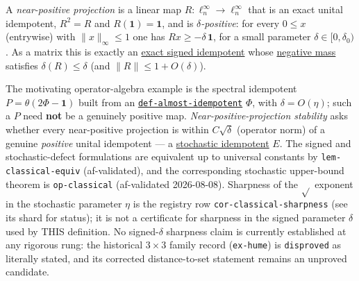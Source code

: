 \hypertarget{def:near-positive-projection}{}%
\begin{definition}\label{def:near-positive-projection}
A \emph{near-positive projection} is a linear map
$R\colon\ell^\infty_n\to\ell^\infty_n$ that is an exact unital idempotent, $R^2=R$ and
$R(\mathbf 1)=\mathbf 1$, and is \emph{$\delta$-positive}: for every $0\le x$ (entrywise) with
$\lVert x\rVert_\infty\le1$ one has $Rx\ge-\delta\,\mathbf 1$, for a small parameter
$\delta\in[0,\delta_0)$. As a matrix this is exactly an \hyperref[def:signed-idempotent]{exact signed idempotent}
whose \hyperref[def:negative-mass]{negative mass} satisfies $\delta(R)\le\delta$ (and $\lVert R\rVert\le1+O(\delta)$).

The motivating operator-algebra example is the spectral idempotent $P=\theta(2\Phi-\mathbf 1)$ built from
an \hyperref[def:almost-idempotent]{\texttt{def-\allowbreak{}almost-\allowbreak{}idempotent}} $\Phi$, with $\delta=O(\eta)$; such a $P$ need \textbf{not} be a genuinely
positive map. \emph{Near-positive-projection stability} asks
whether every near-positive projection is within $C\sqrt\delta$ (operator norm) of a genuine \emph{positive}
unital idempotent --- a \hyperref[def:stochastic]{stochastic idempotent} $E$. The signed and
stochastic-defect formulations are equivalent up to universal constants by
\texttt{lem-\allowbreak{}classical-\allowbreak{}equiv} (af-validated), and the corresponding stochastic upper-bound theorem
is \texttt{op-\allowbreak{}classical} (af-validated 2026-08-08). Sharpness of the $\sqrt{}$ exponent
in the stochastic parameter $\eta$ is the registry row \texttt{cor-\allowbreak{}classical-\allowbreak{}sharpness}
(see its shard for status); it is not a certificate for sharpness in the signed
parameter $\delta$ used by THIS definition. No signed-$\delta$ sharpness claim is
currently established at any rigorous rung: the historical $3\times3$ family record
(\texttt{ex-\allowbreak{}hume}) is \texttt{disproved} as literally stated, and its corrected distance-to-set
statement remains an unproved candidate.
\end{definition}

